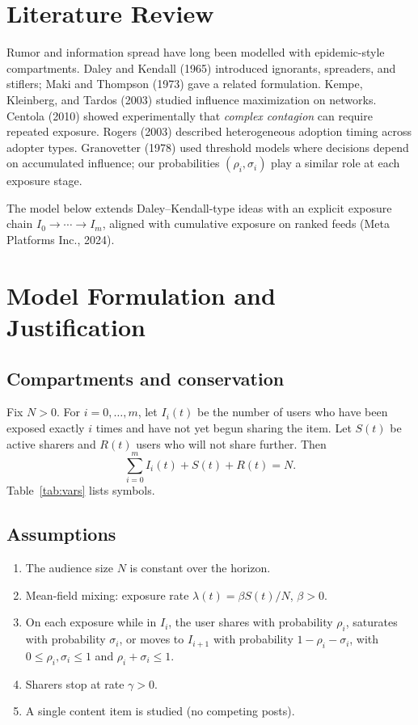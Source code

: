 \documentclass[11pt]{article}
\begin{document}
\section{Literature Review}

Rumor and information spread have long been modelled with epidemic-style compartments. Daley and Kendall (1965) introduced ignorants, spreaders, and stiflers; Maki and Thompson (1973) gave a related formulation. Kempe, Kleinberg, and Tardos (2003) studied influence maximization on networks. Centola (2010) showed experimentally that \emph{complex contagion} can require repeated exposure. Rogers (2003) described heterogeneous adoption timing across adopter types. Granovetter (1978) used threshold models where decisions depend on accumulated influence; our probabilities $(\rho_i,\sigma_i)$ play a similar role at each exposure stage.

The model below extends Daley--Kendall-type ideas with an explicit exposure chain $I_0\to\cdots\to I_m$, aligned with cumulative exposure on ranked feeds (Meta Platforms Inc., 2024).

\section{Model Formulation and Justification}

\subsection{Compartments and conservation}

Fix $N>0$. For $i=0,\ldots,m$, let $I_i(t)$ be the number of users who have been exposed exactly $i$ times and have not yet begun sharing the item. Let $S(t)$ be active sharers and $R(t)$ users who will not share further. Then
\begin{equation}
\sum_{i=0}^{m} I_i(t) + S(t) + R(t) = N.
\label{eq:cons}
\end{equation}
Table~\ref{tab:vars} lists symbols.

\subsection{Assumptions}

\begin{enumerate}
    \item The audience size $N$ is constant over the horizon.
    \item Mean-field mixing: exposure rate $\lambda(t)=\beta S(t)/N$, $\beta>0$.
    \item On each exposure while in $I_i$, the user shares with probability $\rho_i$, saturates with probability $\sigma_i$, or moves to $I_{i+1}$ with probability $1-\rho_i-\sigma_i$, with $0\le\rho_i,\sigma_i\le 1$ and $\rho_i+\sigma_i\le 1$.
    \item Sharers stop at rate $\gamma>0$.
    \item A single content item is studied (no competing posts).
\end{enumerate}
\end{document}
